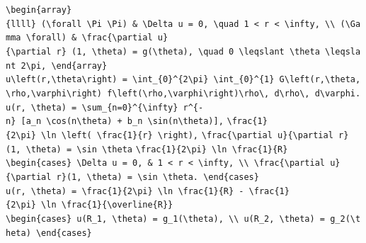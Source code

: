 \documentclass[
  ukrainian,
]{article}
\begin{document}
\texttt{\textbackslash{}begin\{array\}\{llll\}\ (\textbackslash{}forall\ \textbackslash{}Pi\ \textbackslash{}Pi)\ \&\ \textbackslash{}Delta\ u\ =\ 0,\ \textbackslash{}quad\ 1\ \textless{}\ r\ \textless{}\ \textbackslash{}infty,\ \textbackslash{}\textbackslash{}\ (\textbackslash{}Gamma\ \textbackslash{}forall)\ \&\ \textbackslash{}frac\{\textbackslash{}partial\ u\}\{\textbackslash{}partial\ r\}\ (1,\ \textbackslash{}theta)\ =\ g(\textbackslash{}theta),\ \textbackslash{}quad\ 0\ \textbackslash{}leqslant\ \textbackslash{}theta\ \textbackslash{}leqslant\ 2\textbackslash{}pi,\ \textbackslash{}end\{array\}}
\texttt{u\textbackslash{}left(r,\textbackslash{}theta\textbackslash{}right)\ =\ \textbackslash{}int\_\{0\}\^{}\{2\textbackslash{}pi\}\ \textbackslash{}int\_\{0\}\^{}\{1\}\ G\textbackslash{}left(r,\textbackslash{}theta,\textbackslash{}rho,\textbackslash{}varphi\textbackslash{}right)\ f\textbackslash{}left(\textbackslash{}rho,\textbackslash{}varphi\textbackslash{}right)\textbackslash{}rho\textbackslash{},\ d\textbackslash{}rho\textbackslash{},\ d\textbackslash{}varphi.}
\texttt{u(r,\ \textbackslash{}theta)\ =\ \textbackslash{}sum\_\{n=0\}\^{}\{\textbackslash{}infty\}\ r\^{}\{-n\}\ {[}a\_n\ \textbackslash{}cos(n\textbackslash{}theta)\ +\ b\_n\ \textbackslash{}sin(n\textbackslash{}theta){]},}
\texttt{\textbackslash{}frac\{1\}\{2\textbackslash{}pi\}\ \textbackslash{}ln\ \textbackslash{}left(\ \textbackslash{}frac\{1\}\{r\}\ \textbackslash{}right),}
\texttt{\textbackslash{}frac\{\textbackslash{}partial\ u\}\{\textbackslash{}partial\ r\}(1,\ \textbackslash{}theta)\ =\ \textbackslash{}sin\ \textbackslash{}theta}
\texttt{\textbackslash{}frac\{1\}\{2\textbackslash{}pi\}\ \textbackslash{}ln\ \textbackslash{}frac\{1\}\{R\}}
\texttt{\textbackslash{}begin\{cases\}\ \textbackslash{}Delta\ u\ =\ 0,\ \&\ 1\ \textless{}\ r\ \textless{}\ \textbackslash{}infty,\ \textbackslash{}\textbackslash{}\ \textbackslash{}frac\{\textbackslash{}partial\ u\}\{\textbackslash{}partial\ r\}(1,\ \textbackslash{}theta)\ =\ \textbackslash{}sin\ \textbackslash{}theta.\ \textbackslash{}end\{cases\}}
\texttt{u(r,\ \textbackslash{}theta)\ =\ \textbackslash{}frac\{1\}\{2\textbackslash{}pi\}\ \textbackslash{}ln\ \textbackslash{}frac\{1\}\{R\}\ -\ \textbackslash{}frac\{1\}\{2\textbackslash{}pi\}\ \textbackslash{}ln\ \textbackslash{}frac\{1\}\{\textbackslash{}overline\{R\}\}}
\texttt{\textbackslash{}begin\{cases\}\ u(R\_1,\ \textbackslash{}theta)\ =\ g\_1(\textbackslash{}theta),\ \textbackslash{}\textbackslash{}\ u(R\_2,\ \textbackslash{}theta)\ =\ g\_2(\textbackslash{}theta)\ \textbackslash{}end\{cases\}}
\end{document}
